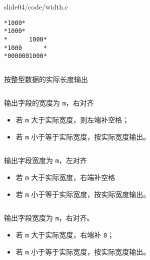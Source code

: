 \begin{frame}[fragile]
  
  {slide04/code/width.c} \pause 

\begin{lstlisting}[showspaces=true,basicstyle=\ttfamily\small]
*1000*
*1000*
*      1000*
*1000      *
*0000001000*
\end{lstlisting}
\end{frame}

\begin{frame}[fragile]
  \begin{lstlisting}[backgroundcolor=\color{red!20}]
%d
  \end{lstlisting}
  按整型数据的实际长度输出 \vspace{.1in}\pause

  \begin{lstlisting}[backgroundcolor=\color{red!20}]
%md
  \end{lstlisting}
  输出字段的宽度为 \lstinline|m|，右对齐
  \begin{itemize}
  \item 若 \lstinline|m| 大于实际宽度，则左端补空格；
  \item 若 \lstinline|m| 小于等于实际宽度，按实际宽度输出。
  \end{itemize} \vspace{.1in}\pause
  
  \begin{lstlisting}[backgroundcolor=\color{red!20}]
%-md
  \end{lstlisting}
  输出字段宽度为 \lstinline|m|，左对齐
  \begin{itemize}
  \item 若 \lstinline|m| 大于实际宽度，右端补空格
  \item 若 \lstinline|m| 小于等于实际宽度，按实际宽度输出。
  \end{itemize}

\end{frame}

\begin{frame}[fragile]

  \begin{lstlisting}[backgroundcolor=\color{red!20}]
%0md
  \end{lstlisting}  
  输出字段宽度为 \lstinline|m|，右对齐。
  \begin{itemize}
  \item 若 \lstinline|m| 大于实际宽度，右端补 \lstinline|0|；
  \item 若 \lstinline|m| 小于等于实际宽度，按实际宽度输出。
  \end{itemize}

\end{frame}

